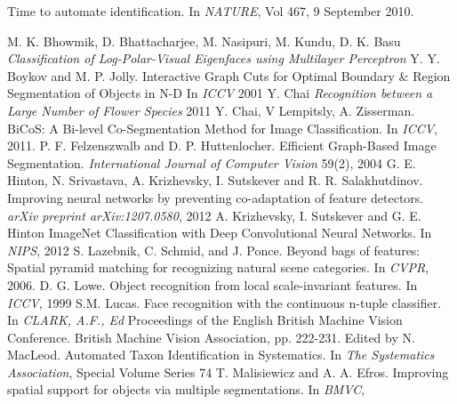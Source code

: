 \documentclass[11pt, titlepage, oneside]{article}
\theoremstyle{plain}
\theoremstyle{definition}
\theoremstyle{remark}
\begin{document}
\newpage

\begin{thebibliography}{2}
		Time to automate identification.
		In \emph{NATURE},
		Vol 467,
		9 September 2010.

		M. K. Bhowmik, D. Bhattacharjee, M. Nasipuri, M. Kundu, D. K. Basu 
		\emph{Classification of Log-Polar-Visual Eigenfaces using Multilayer Perceptron}
		Y. Y. Boykov and M. P. Jolly.
		Interactive Graph Cuts for Optimal Boundary \& Region Segmentation of Objects in N-D
		In \emph{ICCV}
		2001
		Y. Chai
		\emph{Recognition between a Large Number of Flower Species}
		2011
		Y. Chai, V Lempitsly, A. Zisserman.
		BiCoS: A Bi-level Co-Segmentation Method for Image Classification. 
		In \emph{ICCV},
		2011.
		P. F. Felzenszwalb and D. P. Huttenlocher.
		Efficient Graph-Based Image Segmentation.
		\emph{International Journal of Computer Vision}
		59(2),
		2004
		G. E. Hinton, N. Srivastava, A. Krizhevsky, I. Sutskever and R. R. Salakhutdinov.
		Improving neural networks by preventing co-adaptation of feature detectors.
		\emph{arXiv preprint arXiv:1207.0580},
		2012
		A. Krizhevsky, I. Sutskever and G. E. Hinton
		ImageNet Classification with Deep Convolutional Neural Networks.
		In \emph{NIPS},
		2012
		 S. Lazebnik, C. Schmid, and J. Ponce.
		 Beyond bags of features: Spatial pyramid matching for recognizing natural scene categories.
		 In \emph{CVPR},
		 2006.
		D. G. Lowe.
		Object recognition from local scale-invariant features.
		In \emph{ICCV},
		1999
		S.M. Lucas.
		Face recognition with the continuous n-tuple classifier.
		In \emph{CLARK, A.F., Ed}
		Proceedings of the English British Machine Vision Conference.
		British Machine Vision Association, pp. 222-231.
		Edited by N. MacLeod.
		Automated Taxon Identification in Systematics.
		In \emph{The Systematics Association},
		Special Volume Series 74
		T. Malisiewicz and A. A. Efros.
		Improving spatial support for objects via multiple segmentations.
		In \emph{BMVC},

\end{thebibliography}
\end{document}
